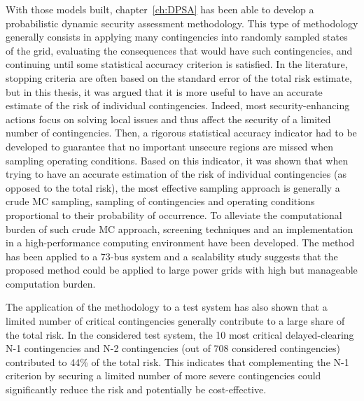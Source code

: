 With those models built, chapter~\ref{ch:DPSA} has been able to develop a probabilistic dynamic security assessment methodology. This type of methodology generally consists in applying many contingencies into randomly sampled states of the grid, evaluating the consequences that would have such contingencies, and continuing until some statistical accuracy criterion is satisfied. In the literature, stopping criteria are often based on the standard error of the total risk estimate, but in this thesis, it was argued that it is more useful to have an accurate estimate of the risk of individual contingencies. Indeed, most security-enhancing actions focus on solving local issues and thus affect the security of a limited number of contingencies. Then, a rigorous statistical accuracy indicator had to be developed to guarantee that no important unsecure regions are missed when sampling operating conditions. Based on this indicator, it was shown that when trying to have an accurate estimation of the risk of individual contingencies (as opposed to the total risk), the most effective sampling approach is generally a crude MC sampling, \ie sampling of contingencies and operating conditions proportional to their probability of occurrence. To alleviate the computational burden of such crude MC approach, screening techniques and an implementation in a high-performance computing environment have been developed. The method has been applied to a 73-bus system and a scalability study suggests that the proposed method could be applied to large power grids with high but manageable computation burden.

The application of the methodology to a test system has also shown that a limited number of critical contingencies generally contribute to a large share of the total risk. In the considered test system, the 10 most critical delayed-clearing N-1 contingencies and N-2 contingencies (out of 708 considered contingencies) contributed to 44\% of the total risk. This indicates that complementing the N-1 criterion by securing a limited number of more severe contingencies could significantly reduce the risk and potentially be cost-effective.

